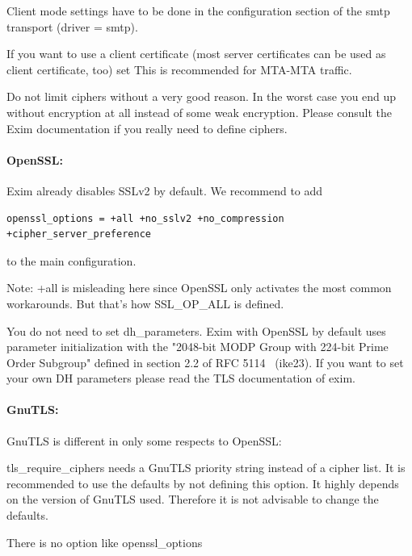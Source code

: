 Client mode settings have to be done in the configuration section of the smtp transport (driver = smtp).

If you want to use a client certificate (most server certificates can be used as client certificate, too) set
This is recommended for MTA-MTA traffic.

Do not limit ciphers without a very good reason. In the worst case you end up without encryption at all instead of some weak encryption. Please consult the Exim documentation if you really need to define ciphers.

\paragraph{OpenSSL:}
Exim already disables SSLv2 by default. We recommend to add
\begin{lstlisting}
openssl_options = +all +no_sslv2 +no_compression +cipher_server_preference
\end{lstlisting}
to the main configuration.

Note: +all is misleading here since OpenSSL only activates the most common workarounds. But that's how SSL\_OP\_ALL is defined.

You do not need to set dh\_parameters. Exim with OpenSSL by default uses parameter initialization with the "2048-bit MODP Group with 224-bit Prime Order Subgroup" defined in section 2.2 of RFC 5114~\cite{rfc5114} (ike23).
If you want to set your own DH parameters please read the TLS documentation of exim.


\paragraph{GnuTLS:}
GnuTLS is different in only some respects to OpenSSL:
\begin{itemize*}
  \item tls\_require\_ciphers needs a GnuTLS priority string instead of a cipher list. It is recommended to use the defaults by not defining this option. It highly depends on the version of GnuTLS used. Therefore it is not advisable to change the defaults.
  \item There is no option like openssl\_options
\end{itemize*}


